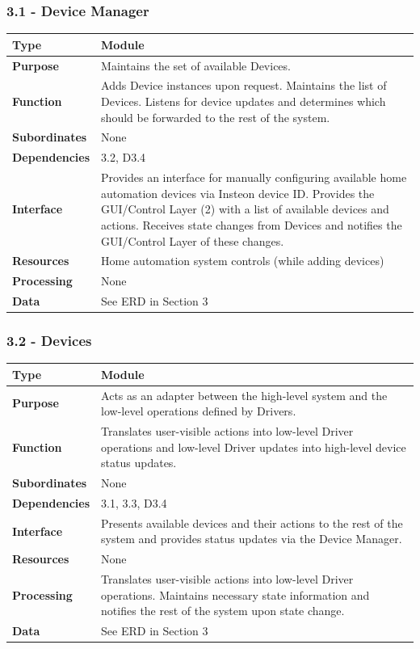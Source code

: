 \documentclass{article}
\begin{document}
\subsubsection*{3.1 - Device Manager}
\begin{tabular}{ | l |  p{13.3cm} |}
\hline
\textbf{Type} & Module \\ \hline
\textbf{Purpose} & Maintains the set of available Devices. \\ \hline
\textbf{Function} & Adds Device instances upon request. Maintains the list of
Devices. Listens for device updates and determines which should be forwarded
to the rest of the system. \\ \hline
\textbf{Subordinates} & None \\ \hline
\textbf{Dependencies} & 3.2, D3.4 \\ \hline
\textbf{Interface} & Provides an interface for manually configuring available
home automation devices via Insteon device ID. Provides the GUI/Control Layer
(2) with a list of available devices and actions. Receives state changes from
Devices and notifies the GUI/Control Layer of these changes. \\ \hline
\textbf{Resources} & Home automation system controls (while adding devices) \\ \hline
\textbf{Processing} & None \\ \hline
\textbf{Data} & See ERD in Section 3 \\ \hline
\end{tabular}

\subsubsection*{3.2 - Devices}
\begin{tabular}{ | l |  p{13.3cm} |}
\hline
\textbf{Type} & Module \\ \hline
\textbf{Purpose} & Acts as an adapter between the high-level system and the
low-level operations defined by Drivers. \\ \hline
\textbf{Function} & Translates user-visible actions into low-level Driver
operations and low-level Driver updates into high-level device status updates.
\\ \hline
\textbf{Subordinates} & None \\ \hline
\textbf{Dependencies} & 3.1, 3.3, D3.4 \\ \hline
\textbf{Interface} & Presents available devices and their actions to the
rest of the system and provides status updates via the Device Manager. \\ \hline
\textbf{Resources} & None \\ \hline
\textbf{Processing} & Translates user-visible actions into low-level Driver
operations. Maintains necessary state information and notifies the rest of the
system upon state change. \\ \hline
\textbf{Data} & See ERD in Section 3 \\ \hline
\end{tabular}
\end{document}
